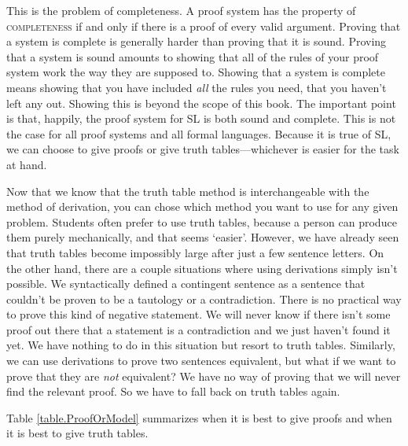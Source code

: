 This is the problem of completeness. A proof system has the property of  \textsc{\gls{completeness}} \label{def:completeness} if and only if there is a proof of every valid argument. Proving that a system is complete is generally harder than proving that it is sound. Proving that a system is sound amounts to showing that all of the rules of your proof system work the way they are supposed to. Showing that a system is complete means showing that you have included \emph{all} the rules you need, that you haven't left any out. Showing this is beyond the scope of this book. The important point is that, happily, the proof system for SL is both sound and complete. This is not the case for all proof systems and all formal languages. Because it is true of SL, we can choose to give proofs or give truth tables---whichever is easier for the task at hand.

Now that we know that the truth table method is interchangeable with the method of derivation, you can chose which method you want to use for any given problem. Students often prefer to use truth tables, because a person can produce them purely mechanically, and that seems `easier'. However, we have already seen that truth tables become impossibly large after just a few sentence letters. On the other hand, there are a couple situations where using derivations simply isn't possible. We syntactically defined a contingent sentence as a sentence that couldn't be proven to be a tautology or a contradiction. There is no practical way to prove this kind of negative statement. We will never know if there isn't some proof out there that a statement is a contradiction and we just haven't found it yet. We have nothing to do in this situation but resort to truth tables. Similarly, we can use derivations to prove two sentences equivalent, but what if we want to prove that they are \emph{not} equivalent? We have no way of proving that we will never find the relevant proof. So we have to fall back on truth tables again.

Table \ref{table.ProofOrModel} summarizes when it is best to give proofs and when it is best to give truth tables. 

